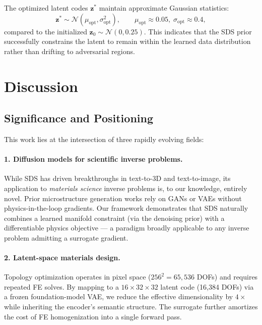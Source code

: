 \documentclass[12pt,a4paper]{article}
\newcommand{\N}{\mathcal{N}}
\newcommand{\zvec}{\bm{z}}
\theoremstyle{definition}
\begin{document}
The optimized latent codes $\zvec^*$ maintain approximate Gaussian
statistics:
\begin{equation}
  \zvec^* \sim \N(\mu_{\mathrm{opt}}, \sigma_{\mathrm{opt}}^2),
  \qquad \mu_{\mathrm{opt}} \approx 0.05,\; \sigma_{\mathrm{opt}} \approx 0.4,
\end{equation}
compared to the initialized $\zvec_0 \sim \N(0, 0.25)$.  This indicates
that the SDS prior successfully constrains the latent to remain within
the learned data distribution rather than drifting to adversarial regions.

\section{Discussion}
\label{sec:discussion}

\subsection{Significance and Positioning}

This work lies at the intersection of three rapidly evolving fields:

\paragraph{1. Diffusion models for scientific inverse problems.}
While SDS \cite{poole2023dreamfusion} has driven breakthroughs in
text-to-3D and text-to-image, its application to \emph{materials
science} inverse problems is, to our knowledge, entirely novel.  Prior
microstructure generation works rely on GANs or VAEs without
physics-in-the-loop gradients.  Our framework demonstrates that SDS
naturally combines a learned manifold constraint (via the denoising
prior) with a differentiable physics objective --- a paradigm broadly
applicable to any inverse problem admitting a surrogate gradient.

\paragraph{2. Latent-space materials design.}
Topology optimization operates in pixel space ($256^2 = 65{,}536$ DOFs)
and requires repeated FE solves.  By mapping to a $16 \times 32 \times 32$
latent code (16{,}384 DOFs) via a frozen foundation-model VAE, we reduce
the effective dimensionality by $4\times$ while inheriting the encoder's
semantic structure.  The surrogate further amortizes the cost of FE
homogenization into a single forward pass.
\end{document}
